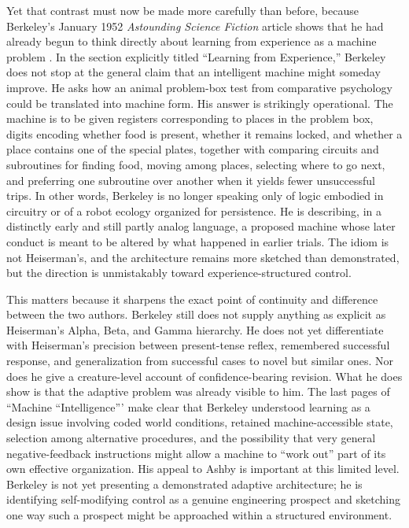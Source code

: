 \documentclass[11pt]{article}
\begin{document}
Yet that contrast must now be made more carefully than before, because Berkeley's January 1952 \emph{Astounding Science Fiction} article shows that he had already begun to think directly about learning from experience as a machine problem \citep{berkeley1952machineintelligence}. In the section explicitly titled ``Learning from Experience,'' Berkeley does not stop at the general claim that an intelligent machine might someday improve. He asks how an animal problem-box test from comparative psychology could be translated into machine form. His answer is strikingly operational. The machine is to be given registers corresponding to places in the problem box, digits encoding whether food is present, whether it remains locked, and whether a place contains one of the special plates, together with comparing circuits and subroutines for finding food, moving among places, selecting where to go next, and preferring one subroutine over another when it yields fewer unsuccessful trips. In other words, Berkeley is no longer speaking only of logic embodied in circuitry or of a robot ecology organized for persistence. He is describing, in a distinctly early and still partly analog language, a proposed machine whose later conduct is meant to be altered by what happened in earlier trials. The idiom is not Heiserman's, and the architecture remains more sketched than demonstrated, but the direction is unmistakably toward experience-structured control.

This matters because it sharpens the exact point of continuity and difference between the two authors. Berkeley still does not supply anything as explicit as Heiserman's Alpha, Beta, and Gamma hierarchy. He does not yet differentiate with Heiserman's precision between present-tense reflex, remembered successful response, and generalization from successful cases to novel but similar ones. Nor does he give a creature-level account of confidence-bearing revision. What he does show is that the adaptive problem was already visible to him. The last pages of ``Machine ``Intelligence''' make clear that Berkeley understood learning as a design issue involving coded world conditions, retained machine-accessible state, selection among alternative procedures, and the possibility that very general negative-feedback instructions might allow a machine to ``work out'' part of its own effective organization. His appeal to Ashby is important at this limited level. Berkeley is not yet presenting a demonstrated adaptive architecture; he is identifying self-modifying control as a genuine engineering prospect and sketching one way such a prospect might be approached within a structured environment.
\end{document}
